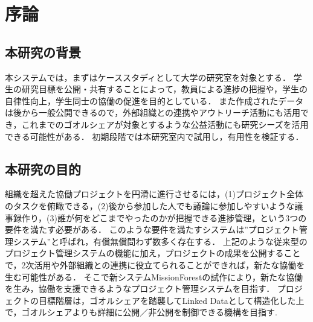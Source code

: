 \chapter{序論}
\label{chap:intro}

\section{本研究の背景}
本システムでは，まずはケーススタディとして大学の研究室を対象とする．
学生の研究目標を公開・共有することによって，教員による進捗の把握や，学生の自律性向上，学生同士の協働の促進を目的としている．
また作成されたデータは後から一般公開できるので，外部組織との連携やアウトリーチ活動にも活用でき，これまでのゴオルシェアが対象とするような公益活動にも研究シーズを活用できる可能性がある．
初期段階では本研究室内で試用し，有用性を検証する．

\section{本研究の目的}
組織を超えた協働プロジェクトを円滑に進行させるには，(1)プロジェクト全体のタスクを俯瞰できる，(2)後から参加した人でも議論に参加しやすいような議事録作り，(3)誰が何をどこまでやったのかが把握できる進捗管理，という3つの要件を満たす必要がある．
このような要件を満たすシステムは”プロジェクト管理システム”と呼ばれ，有償無償問わず数多く存在する．
上記のような従来型のプロジェクト管理システムの機能に加え，プロジェクトの成果を公開することで，2次活用や外部組織との連携に役立てられることができれば，新たな協働を生む可能性がある．
そこで新システムMissionForestの試作により，新たな協働を生み，協働を支援できるようなプロジェクト管理システムを目指す．
プロジェクトの目標階層は，ゴオルシェアを踏襲してLinked Dataとして構造化した上で，ゴオルシェアよりも詳細に公開／非公開を制御できる機構を目指す.


